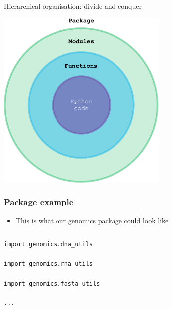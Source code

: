 \documentclass[pdf]{beamer}
\begin{document}
\begin{frame}{Hierarchical organisation: divide and conquer}

\begin{center}
	\includegraphics[width=0.62\textwidth, keepaspectratio]{package.pdf}
\end{center}

\end{frame}

\begin{frame}[fragile]
\frametitle{Package example}

\begin{itemize}
	\item This is what our genomics package could look like
\end{itemize}

\begin{columns}


\begin{lstlisting}[style=python]
import genomics.dna_utils

import genomics.rna_utils

import genomics.fasta_utils

...
\end{lstlisting}
\end{columns}

\end{frame}
\end{document}
